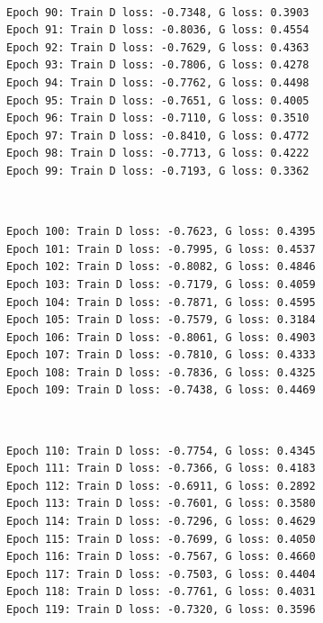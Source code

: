 \documentclass[11pt]{article}
\begin{document}
    \begin{center}
    \end{center}
    { \hspace*{\fill} \\}
    
    \begin{Verbatim}[commandchars=\\\{\}]
Epoch 90: Train D loss: -0.7348, G loss: 0.3903
Epoch 91: Train D loss: -0.8036, G loss: 0.4554
Epoch 92: Train D loss: -0.7629, G loss: 0.4363
Epoch 93: Train D loss: -0.7806, G loss: 0.4278
Epoch 94: Train D loss: -0.7762, G loss: 0.4498
Epoch 95: Train D loss: -0.7651, G loss: 0.4005
Epoch 96: Train D loss: -0.7110, G loss: 0.3510
Epoch 97: Train D loss: -0.8410, G loss: 0.4772
Epoch 98: Train D loss: -0.7713, G loss: 0.4222
Epoch 99: Train D loss: -0.7193, G loss: 0.3362

    \end{Verbatim}

    \begin{center}
    \end{center}
    { \hspace*{\fill} \\}
    
    \begin{Verbatim}[commandchars=\\\{\}]
Epoch 100: Train D loss: -0.7623, G loss: 0.4395
Epoch 101: Train D loss: -0.7995, G loss: 0.4537
Epoch 102: Train D loss: -0.8082, G loss: 0.4846
Epoch 103: Train D loss: -0.7179, G loss: 0.4059
Epoch 104: Train D loss: -0.7871, G loss: 0.4595
Epoch 105: Train D loss: -0.7579, G loss: 0.3184
Epoch 106: Train D loss: -0.8061, G loss: 0.4903
Epoch 107: Train D loss: -0.7810, G loss: 0.4333
Epoch 108: Train D loss: -0.7836, G loss: 0.4325
Epoch 109: Train D loss: -0.7438, G loss: 0.4469

    \end{Verbatim}

    \begin{center}
    \end{center}
    { \hspace*{\fill} \\}
    
    \begin{Verbatim}[commandchars=\\\{\}]
Epoch 110: Train D loss: -0.7754, G loss: 0.4345
Epoch 111: Train D loss: -0.7366, G loss: 0.4183
Epoch 112: Train D loss: -0.6911, G loss: 0.2892
Epoch 113: Train D loss: -0.7601, G loss: 0.3580
Epoch 114: Train D loss: -0.7296, G loss: 0.4629
Epoch 115: Train D loss: -0.7699, G loss: 0.4050
Epoch 116: Train D loss: -0.7567, G loss: 0.4660
Epoch 117: Train D loss: -0.7503, G loss: 0.4404
Epoch 118: Train D loss: -0.7761, G loss: 0.4031
Epoch 119: Train D loss: -0.7320, G loss: 0.3596

    \end{Verbatim}
\end{document}
